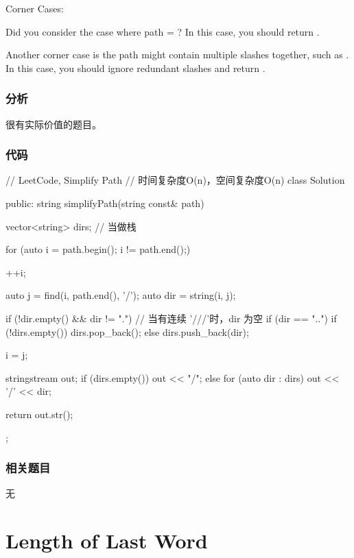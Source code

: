 Corner Cases:
\begindot
\item Did you consider the case where path = ? 
In this case, you should return .
\item 
Another corner case is the path might contain multiple slashes  together, such as .
In this case, you should ignore redundant slashes and return .
\myenddot


\subsubsection{分析}
很有实际价值的题目。


\subsubsection{代码}
\begin{Code}
// LeetCode, Simplify Path
// 时间复杂度O(n)，空间复杂度O(n)
class Solution {
public:
    string simplifyPath(string const& path) {
        vector<string> dirs; // 当做栈

        for (auto i = path.begin(); i != path.end();) {
            ++i;

            auto j = find(i, path.end(), '/');
            auto dir = string(i, j);

            if (!dir.empty() && dir != ".") {// 当有连续 '///'时，dir 为空
                if (dir == "..") {
                    if (!dirs.empty())
                        dirs.pop_back();
                } else
                    dirs.push_back(dir);
            }

            i = j;
        }

        stringstream out;
        if (dirs.empty()) {
            out << "/";
        } else {
            for (auto dir : dirs)
                out << '/' << dir;
        }

        return out.str();
    }
};
\end{Code}


\subsubsection{相关题目}
\begindot
\item 无
\myenddot


\section{Length of Last Word} %
\label{sec:length-of-last-word}


